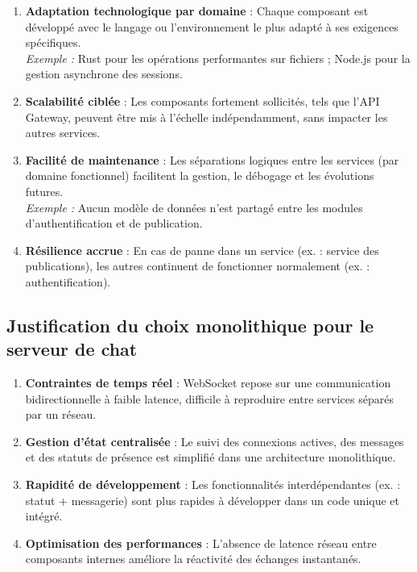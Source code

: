\documentclass{rapportPfe}
\begin{document}
\begin{enumerate}
    \item \textbf{Adaptation technologique par domaine} : Chaque composant est développé avec le langage ou l’environnement le plus adapté à ses exigences spécifiques. \\
    \textit{Exemple :} Rust pour les opérations performantes sur fichiers ; Node.js pour la gestion asynchrone des sessions.
    
    \item \textbf{Scalabilité ciblée} : Les composants fortement sollicités, tels que l’API Gateway, peuvent être mis à l’échelle indépendamment, sans impacter les autres services.
    
    \item \textbf{Facilité de maintenance} : Les séparations logiques entre les services (par domaine fonctionnel) facilitent la gestion, le débogage et les évolutions futures.\\
    \textit{Exemple :} Aucun modèle de données n’est partagé entre les modules d’authentification et de publication.
    
    \item \textbf{Résilience accrue} : En cas de panne dans un service (ex. : service des publications), les autres continuent de fonctionner normalement (ex. : authentification).
\end{enumerate}

\subsection{Justification du choix monolithique pour le serveur de chat}

\begin{enumerate}
    \item \textbf{Contraintes de temps réel} : WebSocket repose sur une communication bidirectionnelle à faible latence, difficile à reproduire entre services séparés par un réseau.
    
    \item \textbf{Gestion d’état centralisée} : Le suivi des connexions actives, des messages et des statuts de présence est simplifié dans une architecture monolithique.
    
    \item \textbf{Rapidité de développement} : Les fonctionnalités interdépendantes (ex. : statut + messagerie) sont plus rapides à développer dans un code unique et intégré.
    
    \item \textbf{Optimisation des performances} : L’absence de latence réseau entre composants internes améliore la réactivité des échanges instantanés.
\end{enumerate}
\end{document}
